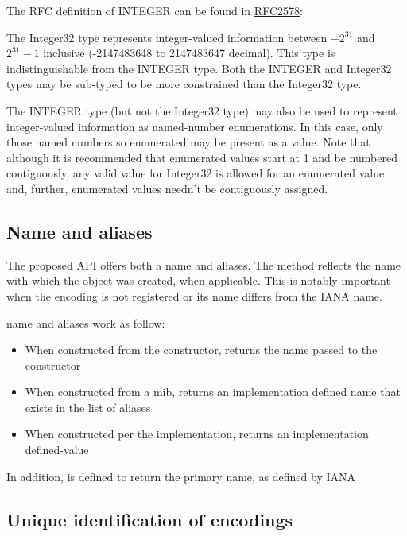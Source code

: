 \documentclass{wg21}
\begin{document}
The RFC definition of INTEGER can be found in \href{https://datatracker.ietf.org/doc/html/rfc2578#section-7.1.1}{RFC2578}:

\begin{quoteblock}
The Integer32 type represents integer-valued information between
$-2^{31}$ and $2^{31}-1$ inclusive (-2147483648 to 2147483647 decimal).  This
type is indistinguishable from the INTEGER type.  Both the INTEGER
and Integer32 types may be sub-typed to be more constrained than the
Integer32 type.

The INTEGER type (but not the Integer32 type) may also be used to
represent integer-valued information as named-number enumerations.
In this case, only those named numbers so enumerated may be present
as a value.  Note that although it is recommended that enumerated
values start at 1 and be numbered contiguously, any valid value for
Integer32 is allowed for an enumerated value and, further, enumerated
values needn't be contiguously assigned.
\end{quoteblock}

\subsection{Name and aliases}

The proposed API offers both a name and aliases.
The  method reflects the name with which the  object was created, when applicable.
This is notably important when the encoding is not registered or its name differs from the IANA name.

name and aliases work as follow:

\begin{itemize}
\item When constructed from the  constructor,  returns the name passed to the constructor
\item When constructed from a mib,  returns an implementation defined name that exists in the list of aliases
\item When constructed per the implementation,  returns an implementation defined-value
\end{itemize}

In addition,  is defined to return the primary name, as defined by IANA

\subsection{Unique identification of encodings}
\end{document}
